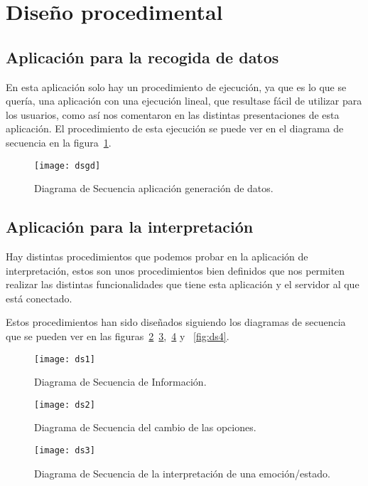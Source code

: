 \section{Diseño procedimental}
\subsection{Aplicación para la recogida de datos}
En esta aplicación solo hay un procedimiento de ejecución, ya que es lo que se quería, una aplicación con una ejecución lineal, que resultase fácil de utilizar para los usuarios, como así nos comentaron en las distintas presentaciones de esta aplicación. El procedimiento de esta ejecución se puede ver en el diagrama de secuencia en la figura~\ref{fig:dsgd}.

\begin{figure}[H]
	\centering
	\texttt{[image: dsgd]}
	\caption{Diagrama de Secuencia aplicación generación de datos.}
	\label{fig:dsgd}
\end{figure}
\subsection{Aplicación para la interpretación}
Hay distintas procedimientos que podemos probar en la aplicación de interpretación, estos son unos procedimientos bien definidos que nos permiten realizar las distintas funcionalidades que tiene esta aplicación y el servidor al que está conectado.

Estos procedimientos han sido diseñados siguiendo los diagramas de secuencia que se pueden ver en las figuras~\ref{fig:ds1}~\ref{fig:ds2},~\ref{fig:ds3} y ~\ref{fig:ds4}.

\begin{figure}[H]
	\centering
	\texttt{[image: ds1]}
	\caption{Diagrama de Secuencia de Información.}
	\label{fig:ds1}
\end{figure}

\begin{figure}[H]
	\centering
	\texttt{[image: ds2]}
	\caption{Diagrama de Secuencia del cambio de las opciones.}
	\label{fig:ds2}
\end{figure}

\begin{figure}[H]
	\centering
	\texttt{[image: ds3]}
	\caption{Diagrama de Secuencia de la interpretación de una emoción/estado.}
	\label{fig:ds3}
\end{figure}

